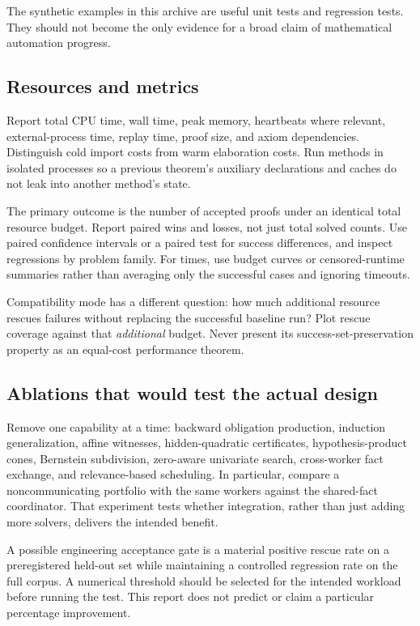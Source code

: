 \documentclass[11pt,a4paper]{article}
\theoremstyle{definition}
\begin{document}
The synthetic examples in this archive are useful unit tests and regression tests. They should not become the only evidence for a broad claim of mathematical automation progress.

\subsection{Resources and metrics}

Report total CPU time, wall time, peak memory, heartbeats where relevant, external-process time, replay time, proof size, and axiom dependencies. Distinguish cold import costs from warm elaboration costs. Run methods in isolated processes so a previous theorem's auxiliary declarations and caches do not leak into another method's state.

The primary outcome is the number of accepted proofs under an identical total resource budget. Report paired wins and losses, not just total solved counts. Use paired confidence intervals or a paired test for success differences, and inspect regressions by problem family. For times, use budget curves or censored-runtime summaries rather than averaging only the successful cases and ignoring timeouts.

Compatibility mode has a different question: how much additional resource rescues failures without replacing the successful baseline run? Plot rescue coverage against that \emph{additional} budget. Never present its success-set-preservation property as an equal-cost performance theorem.

\subsection{Ablations that would test the actual design}

Remove one capability at a time: backward obligation production, induction generalization, affine witnesses, hidden-quadratic certificates, hypothesis-product cones, Bernstein subdivision, zero-aware univariate search, cross-worker fact exchange, and relevance-based scheduling. In particular, compare a noncommunicating portfolio with the same workers against the shared-fact coordinator. That experiment tests whether integration, rather than just adding more solvers, delivers the intended benefit.

A possible engineering acceptance gate is a material positive rescue rate on a preregistered held-out set while maintaining a controlled regression rate on the full corpus. A numerical threshold should be selected for the intended workload before running the test. This report does not predict or claim a particular percentage improvement.
\end{document}
